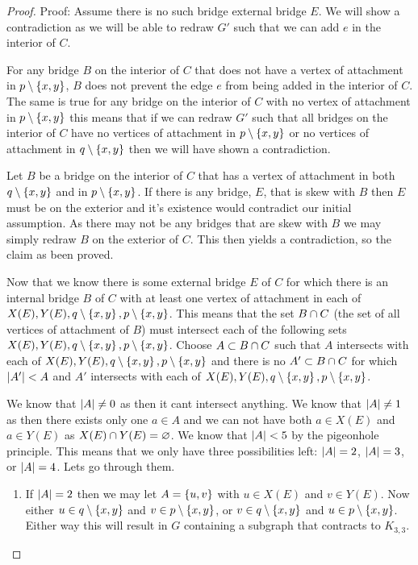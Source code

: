 \documentclass{article}
\begin{document}
\begin{proof}
	Proof: Assume there is no such bridge external bridge $E$. We will show a contradiction as we will be able to redraw $G'$ such that we can add $e$ in the interior of $C$.
	
	For any bridge $B$ on the interior of $C$ that does not have a vertex of attachment in $p\setminus\left\{ {x,y} \right\}$, $B$ does not prevent the edge $e$ from being added in the interior of $C$. The same is true for any bridge on the interior of $C$ with no vertex of attachment in $p\setminus\left\{ {x,y} \right\}$ this means that if we can redraw $G'$ such that all bridges on the interior of $C$ have no vertices of attachment in $p\setminus\left\{ {x,y} \right\}$ or no vertices of attachment in $q\setminus\left\{ {x,y} \right\}$ then we will have shown a contradiction.
	
	Let $B$ be a bridge on the interior of $C$ that has a vertex of attachment in both $q\setminus\left\{ {x,y} \right\}$ and in $p\setminus\left\{ {x,y} \right\}$. If there is any bridge, $E$, that is skew with $B$ then $E$ must be on the exterior and it's existence would contradict our initial assumption. As there may not be any bridges that are skew with $B$ we may simply redraw $B$ on the exterior of $C$. This then yields a contradiction, so the claim as been proved.
	
	Now that we know there is some external bridge $E$ of $C$ for which there is an internal bridge $B$ of $C$ with at least one vertex of attachment in each of $X(E), Y(E), q\setminus\left\{ {x,y} \right\},p\setminus\left\{ {x,y} \right\}$. This means that the set $B\cap C$ (the set of all vertices of attachment of $B$) must intersect each of the following sets $X(E),Y(E),q\setminus\left\{ {x,y} \right\},p\setminus\left\{ {x,y} \right\}$. Choose $A\subset B\cap C$ such that $A$ intersects with each of $X(E),Y(E),q\setminus\left\{ {x,y} \right\},p\setminus\left\{ {x,y} \right\}$ and there is no $A'\subset B\cap C$ for which $\left| {A'} \right| < A$ and $A'$ intersects with each of $X(E),Y(E),q\setminus\left\{ {x,y} \right\},p\setminus\left\{ {x,y} \right\}$.
	
	We know that $\left| {A} \right|\not=0$ as then it cant intersect anything. We know that $\left| {A} \right|\not= 1$ as then there exists only one $a\in A$ and we can not have both $a\in X(E)$ and $a\in Y(E)$ as $X(E)\cap Y(E) = \varnothing$. We know that $\left| {A} \right| < 5$ by the pigeonhole principle. This means that we only have three possibilities left: $\left| {A} \right| = 2$, $\left| {A} \right| = 3$, or $\left| {A} \right| = 4$. Lets go through them.
	
	\begin{enumerate}
		\item If $\left| {A} \right| = 2$ then we may let $A = \left\{ {u,v} \right\}$ with $u\in X(E)$ and $v\in Y(E)$. Now either $u\in q\setminus\left\{ {x,y} \right\}$ and $v\in p\setminus\left\{ {x,y} \right\}$, or $v\in q\setminus\left\{ {x,y} \right\}$ and $u\in p\setminus\left\{ {x,y} \right\}$. Either way this will result in $G$ containing a subgraph that contracts to $K_{3,3}$.
		

\end{enumerate}
\end{proof}
\end{document}
